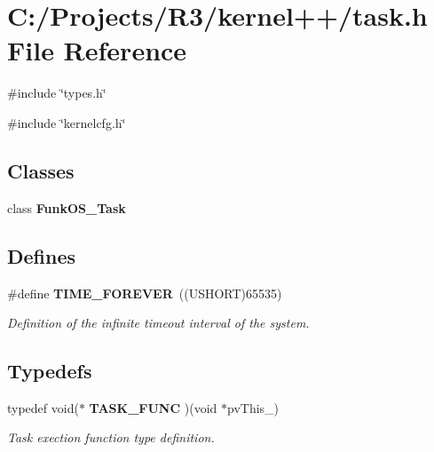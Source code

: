 \section{C:/Projects/R3/kernel++/task.h File Reference}
\label{task_8h}
{\ttfamily \#include \char`\"{}types.h\char`\"{}}\par
{\ttfamily \#include \char`\"{}kernelcfg.h\char`\"{}}\par
\subsection*{Classes}
\begin{DoxyCompactItemize}
\item 
class {\bf FunkOS\_\-Task}
\end{DoxyCompactItemize}
\subsection*{Defines}
\begin{DoxyCompactItemize}
\item 
\#define {\bf TIME\_\-FOREVER}~((USHORT)65535)
\begin{DoxyCompactList}\small\item\em Definition of the infinite timeout interval of the system. \item\end{DoxyCompactList}\end{DoxyCompactItemize}
\subsection*{Typedefs}
\begin{DoxyCompactItemize}
\item 
typedef void($\ast$ {\bf TASK\_\-FUNC} )(void $\ast$pvThis\_\-)
\begin{DoxyCompactList}\small\item\em Task exection function type definition. \item\end{DoxyCompactList}\end{DoxyCompactItemize}
